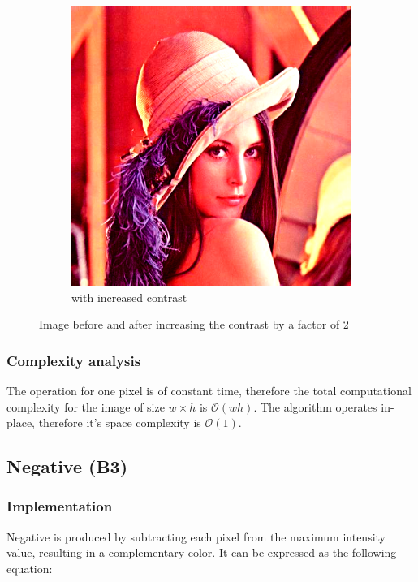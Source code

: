 \documentclass[12pt]{article}
\theoremstyle{definition}
\newcommand{\subfiguresize}{.3\textwidth}
\begin{document}
\begin{figure}[H]
\begin{subfigure}[t]{\subfiguresize}
        \includegraphics[width=\textwidth]{lenac_contrast_2x.png}
        \caption{with increased contrast}
    \end{subfigure}
    \caption{Image before and after increasing the contrast by a factor of 2}
\end{figure}

\subsubsection{Complexity analysis}

The operation for one pixel is of constant time,
therefore the total computational complexity for the image of size $w \times h$ is $\mathcal{O}(wh)$.
The algorithm operates in-place, therefore it's space complexity is $\mathcal{O}(1)$.

\subsection{Negative (B3)}

\subsubsection{Implementation}

Negative is produced by subtracting each pixel from the maximum intensity value, resulting in a complementary color.
It can be expressed as the following equation:
\end{document}
